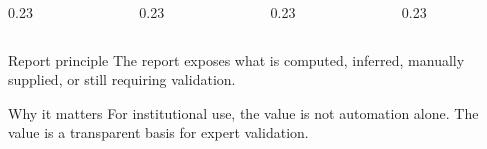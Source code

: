 \begin{frame}[t]

  \vspace{0.25cm}

  \begin{columns}[c,onlytextwidth]
    \begin{column}{0.23\textwidth}
    \end{column}
    \begin{column}{0.23\textwidth}
    \end{column}
    \begin{column}{0.23\textwidth}
    \end{column}
    \begin{column}{0.23\textwidth}
    \end{column}
  \end{columns}

  \vspace{0.7cm}

  \begin{block}{Report principle}
    The report exposes what is computed, inferred, manually supplied, or still requiring validation.
  \end{block}

  \begin{block}{Why it matters}
    For institutional use, the value is not automation alone. The value is a transparent basis for expert validation.
  \end{block}
\end{frame}

